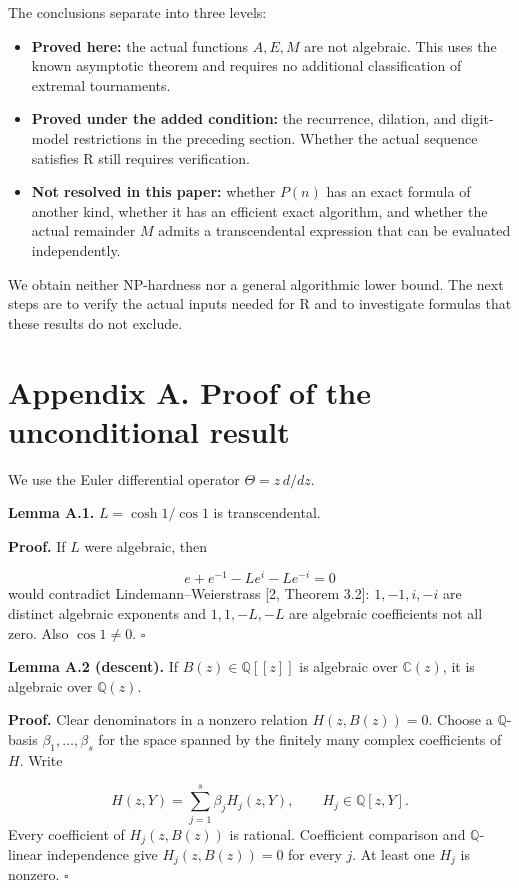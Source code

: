 \documentclass[11pt,a4paper]{article}
\begin{document}
The conclusions separate into three levels:

\begin{itemize}[leftmargin=*]
\item \textbf{Proved here:} the actual functions $A,E,M$ are not algebraic. This uses the known asymptotic theorem and requires no additional classification of extremal tournaments.
\item \textbf{Proved under the added condition:} the recurrence, dilation, and digit-model restrictions in the preceding section. Whether the actual sequence satisfies R still requires verification.
\item \textbf{Not resolved in this paper:} whether $P(n)$ has an exact formula of another kind, whether it has an efficient exact algorithm, and whether the actual remainder $M$ admits a transcendental expression that can be evaluated independently.
\end{itemize}
We obtain neither NP-hardness nor a general algorithmic lower bound. The next steps are to verify the actual inputs needed for R and to investigate formulas that these results do not exclude.

\clearpage
\section*{Appendix A. Proof of the unconditional result}
We use the Euler differential operator $\Theta=z\,d/dz$.

\textbf{Lemma A.1.} $L=\cosh1/\cos1$ is transcendental.

\textbf{Proof.} If $L$ were algebraic, then

\[
e+e^{-1}-Le^i-Le^{-i}=0
\]
would contradict Lindemann–Weierstrass [2, Theorem 3.2]: $1,-1,i,-i$ are distinct algebraic exponents and $1,1,-L,-L$ are algebraic coefficients not all zero. Also $\cos1\ne0$. $\square$

\textbf{Lemma A.2 (descent).} If $B(z)\in\mathbb Q[[z]]$ is algebraic over $\mathbb C(z)$, it is algebraic over $\mathbb Q(z)$.

\textbf{Proof.} Clear denominators in a nonzero relation $H(z,B(z))=0$. Choose a $\mathbb Q$-basis $\beta_1,\ldots,\beta_s$ for the space spanned by the finitely many complex coefficients of $H$. Write

\[
H(z,Y)=\sum_{j=1}^s\beta_jH_j(z,Y),\qquad H_j\in\mathbb Q[z,Y].
\]
Every coefficient of $H_j(z,B(z))$ is rational. Coefficient comparison and $\mathbb Q$-linear independence give $H_j(z,B(z))=0$ for every $j$. At least one $H_j$ is nonzero. $\square$
\end{document}

